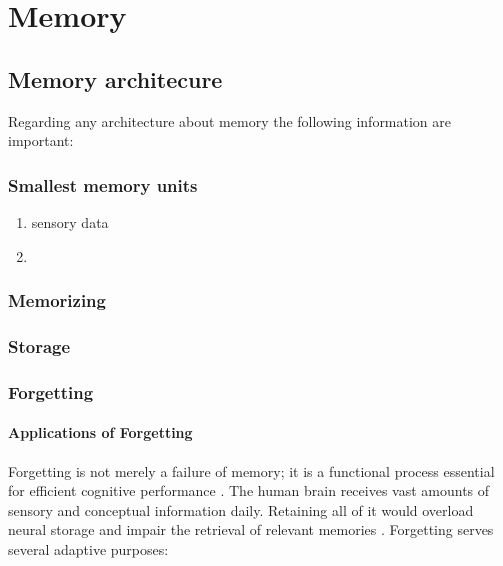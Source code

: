 \chapter{Memory}

\section{Memory architecure}
Regarding any architecture about memory the following information are important:

    \subsection{Smallest memory units}
        \begin{enumerate}
            \item sensory data
            \item
        \end{enumerate}
    \subsection{Memorizing}

    \subsection{Storage}

    \subsection{Forgetting}
        \subsubsection{Applications of Forgetting}
        Forgetting is not merely a failure of memory; it is a functional process essential for efficient cognitive performance \cite{hardt-2013-decay-happens}.
        The human brain receives vast amounts of sensory and conceptual information daily.
        Retaining all of it would overload neural storage and impair the retrieval of relevant memories .
        Forgetting serves several adaptive purposes:

